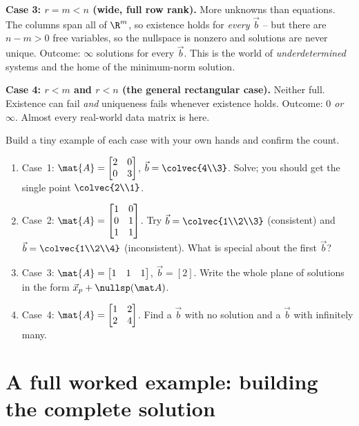 \textbf{Case 3: $r=m<n$ (wide, full row rank).} More unknowns than equations. The columns
span all of $\R^m$, so existence holds for \emph{every} $\vec{b}$ -- but there are
$n-m>0$ free variables, so the nullspace is nonzero and solutions are never unique.
Outcome: \emph{$\infty$} solutions for every $\vec{b}$. This is the world of
\emph{underdetermined} systems and the home of the minimum-norm solution.

\textbf{Case 4: $r<m$ and $r<n$ (the general rectangular case).} Neither full. Existence
can fail \emph{and} uniqueness fails whenever existence holds. Outcome: \emph{$0$ or
$\infty$}. Almost every real-world data matrix is here.

\begin{labbox}
Build a tiny example of each case with your own hands and confirm the count.
\begin{enumerate}
  \item Case~1: $\mat{A}=\begin{bmatrix}2&0\\0&3\end{bmatrix}$, $\vec b=\colvec{4\\3}$.
    Solve; you should get the single point $\colvec{2\\1}$.
  \item Case~2: $\mat{A}=\begin{bmatrix}1&0\\0&1\\1&1\end{bmatrix}$. Try
    $\vec{b}=\colvec{1\\2\\3}$ (consistent) and $\vec{b}=\colvec{1\\2\\4}$ (inconsistent).
    What is special about the first $\vec b$?
  \item Case~3: $\mat{A}=\begin{bmatrix}1&1&1\end{bmatrix}$, $\vec{b}=[2]$. Write the whole
    plane of solutions in the form $\vec{x}_p+\nullsp(\mat A)$.
  \item Case~4: $\mat{A}=\begin{bmatrix}1&2\\2&4\end{bmatrix}$. Find a $\vec b$ with no
    solution and a $\vec b$ with infinitely many.
\end{enumerate}
\end{labbox}

\section{A full worked example: building the complete solution}

